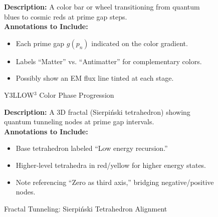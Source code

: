 \documentclass[11pt]{article}
\begin{document}
\begin{figure}[p]
\caption{Y3LLOW$^3$ Color Phase Progression}
\label{fig:colorPhases}
\textbf{Description:}  
A color bar or wheel transitioning from quantum blues to cosmic reds at prime gap steps.
\\[0.5em]
\textbf{Annotations to Include:}
\begin{itemize}
    \item Each prime gap $g(p_n)$ indicated on the color gradient.
    \item Labels “Matter” vs. “Antimatter” for complementary colors.
    \item Possibly show an EM flux line tinted at each stage.
\end{itemize}
\end{figure}

\begin{figure}[p]
\caption{Fractal Tunneling: Sierpi\'nski Tetrahedron Alignment}
\label{fig:fractalTunneling}
\textbf{Description:}  
A 3D fractal (Sierpi\'nski tetrahedron) showing quantum tunneling nodes at prime gap intervals.
\\[0.5em]
\textbf{Annotations to Include:}
\begin{itemize}
    \item Base tetrahedron labeled “Low energy recursion.”
    \item Higher-level tetrahedra in red/yellow for higher energy states.
    \item Note referencing “Zero as third axis,” bridging negative/positive nodes.
\end{itemize}
\end{figure}

\clearpage
\end{document}
